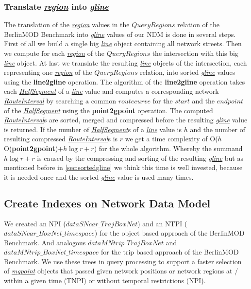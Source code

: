\documentclass[a4paper]{article}
\newcommand{\bmodb} {BerlinMOD Benchmark}
\newcommand{\op}[1]{\textbf{#1}}
\newcommand{\dt}[1]{\textsl{\underline{#1}}}
\begin{document}
\subsubsection{Translate \dt{region} into \dt{gline}}
The translation of the \dt{region} values in the $QueryRegions$ relation of the
\bmodb{} into \dt{gline} values of our NDM is done in several steps.
First of all we build a single big \dt{line} object containing all network streets.
Then we compute for each \dt{region} of the $QueryRegions$ the intersection with
this big \dt{line} object. At last we translate the resulting \dt{line} objects
of the intersection, each representing one \dt{region} of the $QueryRegions$
relation, into sorted \dt{gline} values using the \op{line2gline} operation.
The algorithm of the \op{line2gline} operation takes each \dt{HalfSegment} of a
\dt{line} value and computes a corresponding network \dt{RouteInterval} by
searching a common $route curve$ for the $start$ and the $end point$ of the
\dt{HalfSegment} using the \op{point2gpoint} operation. The computed
\dt{RouteInterval}s are sorted, merged and compressed before the resulting
\dt{gline} value is returned. If the number of \dt{HalfSegment}s of a \dt{line}
value is $h$ and the number of resulting compressed \dt{RouteInterval}s is $r$
we get a time complexity of O($h$O(\op{point2gpoint})$+ h \log r + r$) for the
whole algorithm. Whereby the summand $h \log r + r$ is caused by the compressing
and sorting of the resulting \dt{gline} but as mentioned before
in \ref{sec:sortedgline} we think this time is well invested, because it is needed
once and the sorted \dt{gline} value is used many times. 
\subsection{Create Indexes on Network Data Model}
\label{sec:createIndex}

We created an NPI ($dataSNcar\_TrajBoxNet$) and an NTPI ($dataSNcar\_BoxNet\_timespace$)
for the object based approach of the \bmodb{}. And analogous $dataMNtrip\_TrajBoxNet$
and $dataMNtrip\_BoxNet\_timespace$ for the trip based approach of the \bmodb{}.
We use these trees in query processing to support a faster selection of
\dt{mgpoint} objects that passed given network positions or network regions at /
within a given time (TNPI) or without temporal restrictions (NPI).
\end{document}
